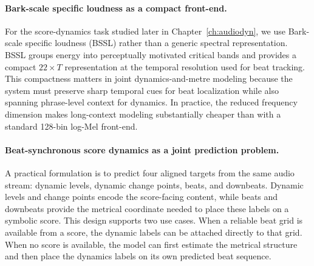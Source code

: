 

\paragraph{Bark-scale specific loudness as a compact front-end.}
For the score-dynamics task studied later in Chapter~\ref{ch:audiodyn}, we use Bark-scale specific loudness (BSSL) rather than a generic spectral representation. BSSL groups energy into perceptually motivated critical bands and provides a compact $22 \times T$ representation at the temporal resolution used for beat tracking. This compactness matters in joint dynamics-and-metre modeling because the system must preserve sharp temporal cues for beat localization while also spanning phrase-level context for dynamics. In practice, the reduced frequency dimension makes long-context modeling substantially cheaper than with a standard 128-bin log-Mel front-end.


\paragraph{Beat-synchronous score dynamics as a joint prediction problem.}
A practical formulation is to predict four aligned targets from the same audio stream: dynamic levels, dynamic change points, beats, and downbeats. Dynamic levels and change points encode the score-facing content, while beats and downbeats provide the metrical coordinate needed to place these labels on a symbolic score. This design supports two use cases. When a reliable beat grid is available from a score, the dynamic labels can be attached directly to that grid. When no score is available, the model can first estimate the metrical structure and then place the dynamics labels on its own predicted beat sequence.

